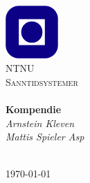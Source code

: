 \begin{titlepage}
\begin{center}
\includegraphics[width=0.15\textwidth]{img/NTNU.png}~\\[1cm]

\textsc{\LARGE NTNU}\\[1.5cm]

\textsc{\Large Sanntidsystemer}\\[0.5cm]

\HRule \\[0.4cm]
{ \huge \bfseries Kompendie}\\[0.5cm]
{\Large \textit{Arnstein Kleven}}\\[0.2cm]
{\large \textit{
Mattis Spieler Asp
}}\\[0.2cm]
\HRule \\[1.5cm]



\vfill

{\large \today}
\end{center}
\end{titlepage}
